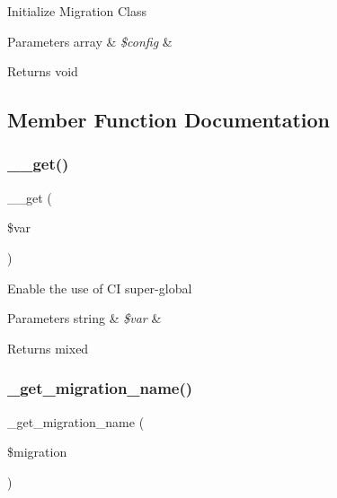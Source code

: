 Initialize Migration Class


\begin{DoxyParams}[1]{Parameters}
array & {\em \$config} & \\
\hline
\end{DoxyParams}
\begin{DoxyReturn}{Returns}
void 
\end{DoxyReturn}


\subsection{Member Function Documentation}
\mbox{\label{class_c_i___migration_a8fb2d9cdca17b87400e780b9f9720933}} 
\subsubsection{\texorpdfstring{\+\_\+\+\_\+get()}{\_\_get()}}
{\footnotesize\ttfamily \+\_\+\+\_\+get (\begin{DoxyParamCaption}\item[{}]{\$var }\end{DoxyParamCaption})}

Enable the use of CI super-\/global


\begin{DoxyParams}[1]{Parameters}
string & {\em \$var} & \\
\hline
\end{DoxyParams}
\begin{DoxyReturn}{Returns}
mixed 
\end{DoxyReturn}
\mbox{\label{class_c_i___migration_a71388693ccdefaea24ca259a0f389806}} 
\subsubsection{\texorpdfstring{\+\_\+get\+\_\+migration\+\_\+name()}{\_get\_migration\_name()}}
{\footnotesize\ttfamily \+\_\+get\+\_\+migration\+\_\+name (\begin{DoxyParamCaption}\item[{}]{\$migration }\end{DoxyParamCaption})\hspace{0.3cm}{\ttfamily [protected]}}

